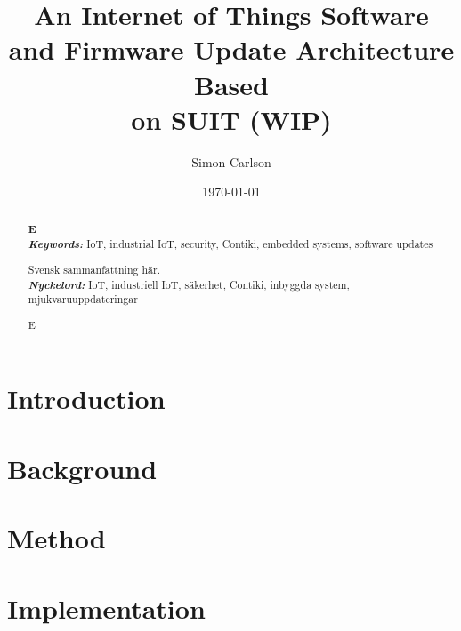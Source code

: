 \documentclass{kththesis}
\title{An Internet of Things Software and Firmware Update Architecture Based\\on SUIT (WIP)}
\author{Simon Carlson}
\date{\today}
\providecommand{\keywords}[1]{\textbf{\textit{Keywords:}} #1}
\providecommand{\nyckelord}[1]{\textbf{\textit{Nyckelord:}} #1}
\begin{document}
\frontmatter

\titlepage

\begin{abstract}
\textbf{E}\\


\noindent\keywords{IoT, industrial IoT, security, Contiki, embedded systems, 
                    software updates}
\end{abstract}

\begin{otherlanguage}{swedish}
    \begin{abstract}
        Svensk sammanfattning här.\\

        \noindent\nyckelord{IoT, industriell IoT, säkerhet, Contiki, inbyggda system,
                            mjukvaruuppdateringar}
    \end{abstract}
\end{otherlanguage}


\renewcommand{\abstractname}{Acknowledgements}
\begin{abstract}
    E
\end{abstract}

\tableofcontents
\listoftables
\listoffigures
\printglossaries

\mainmatter


\chapter{Introduction}


\chapter{Background}


\chapter{Method}


\chapter{Implementation}


\printbibliography[heading=bibintoc] %


\end{document}
